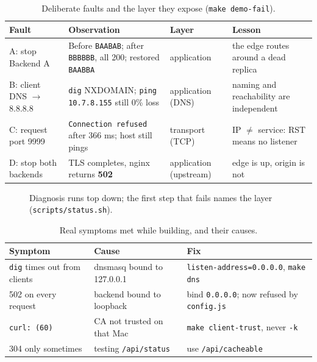 \documentclass[11pt,a4paper]{article}
\begin{document}
\begin{table}[H]
\centering
\caption{Deliberate faults and the layer they expose (\texttt{make demo-fail}).}
{\small
\begin{tabular}{@{}p{3.0cm}p{5.6cm}p{2.6cm}p{3.2cm}@{}}
\toprule
\textbf{Fault} & \textbf{Observation} & \textbf{Layer} & \textbf{Lesson} \\
\midrule
A: stop Backend A & Before \texttt{BAABAB}; after \texttt{BBBBBB}, all 200; restored \texttt{BAABBA} & application & the edge routes around a dead replica \\
B: client DNS $\to$ 8.8.8.8 & \texttt{dig} NXDOMAIN; \texttt{ping 10.7.8.155} still 0\% loss & application (DNS) & naming and reachability are independent \\
C: request port 9999 & \texttt{Connection refused} after 366 ms; host still pings & transport (TCP) & IP $\neq$ service: RST means no listener \\
D: stop both backends & TLS completes, nginx returns \textbf{502} & application (upstream) & edge is up, origin is not \\
\bottomrule
\end{tabular}}
\end{table}

\begin{figure}[H]
\centering
\resizebox{0.96\textwidth}{!}{\drawDiagnose}
\caption{Diagnosis runs top down; the first step that fails names the layer (\texttt{scripts/status.sh}).}
\end{figure}

\begin{table}[H]
\centering
\caption{Real symptoms met while building, and their causes.}
{\small
\begin{tabular}{@{}p{3.8cm}p{4.8cm}p{5.6cm}@{}}
\toprule
\textbf{Symptom} & \textbf{Cause} & \textbf{Fix} \\
\midrule
\texttt{dig} times out from clients & dnsmasq bound to 127.0.0.1 & \texttt{listen-address=0.0.0.0}, \texttt{make dns} \\
502 on every request & backend bound to loopback & bind \texttt{0.0.0.0}; now refused by \texttt{config.js} \\
\texttt{curl: (60)} & CA not trusted on that Mac & \texttt{make client-trust}, never \texttt{-k} \\
304 only sometimes & testing \texttt{/api/status} & use \texttt{/api/cacheable} \\
\bottomrule
\end{tabular}}
\end{table}
\end{document}
